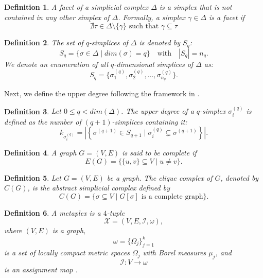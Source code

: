 \documentclass[12pt]{article}
\theoremstyle{normalhead_nobrackets}
\newtheorem{definition}{Definition}[section]
\theoremstyle{exampstyle}
\begin{document}
\begin{definition}
A facet of a simplicial complex $\Delta$ is a simplex that is not contained in any other simplex of $\Delta$. Formally, a simplex $\gamma \in \Delta$ is a facet if
\[
\nexists \tau \in \Delta \setminus \{\gamma\} \text{ such that } \gamma \subseteq \tau
\]
\end{definition}

\begin{definition}
The set of $q$-simplices of $\Delta$ is denoted by $S_q$:
\[
S_q = \{ \sigma \in \Delta \mid dim(\sigma) = q \} \quad \text{with} \quad |S_q| = n_q.
\]
We denote an enumeration of all $q$-dimensional simplices of $\Delta$ as:
\[
S_q = \{ \sigma_1^{(q)}, \sigma_2^{(q)}, \ldots, \sigma_{n_q}^{(q)} \}.
\]
\end{definition}

Next, we define the upper degree following the framework in \cite{goldberg2002}.
\begin{definition}
Let $0 \le q < dim(\Delta)$. The upper degree of a $q$-simplex $\sigma_i^{(q)}$ is defined as the number of $(q+1)$-simplices containing it:
\[
k_{\sigma_i^{(q)}} =
\left|
\left\{
\sigma^{(q+1)} \in S_{q+1} \mid
\sigma_i^{(q)} \subsetneq \sigma^{(q+1)}
\right\}
\right|.
\]
\end{definition}

\begin{definition}
A graph $G = (V,E)$ is said to be complete if
\[
E(G) 
= 
\big\{ \{u,v\} \subseteq V \;\big|\; u \neq v \big\}.
\]
\end{definition}



\begin{definition}
Let $G = (V,E)$ be a graph. 
The clique complex of $G$, denoted by $C(G)$, 
is the abstract simplicial complex defined by
\[
C(G) 
= 
\big\{ \sigma \subseteq V \;\big|\; G[\sigma] \text{ is a complete graph} \big\}.
\]
\end{definition}



\begin{definition}
A metaplex is a $4$-tuple
\[
\mathcal{X} = (V, E, \mathcal{I}, \omega),
\]
where $(V, E)$ is a graph,
\[
\omega = \{\Omega_j\}_{j=1}^k
\]
is a set of locally compact metric spaces $\Omega_j$ with Borel measures $\mu_j$, and
\[
\mathcal{I} : V \to \omega
\]
is an assignment map \cite{estrada2020metaplex}.
\end{definition}
\end{document}
